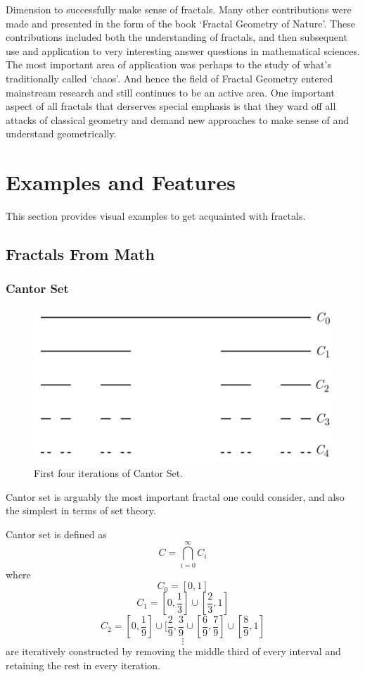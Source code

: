 Dimension to successfully make sense of fractals. Many other contributions were
made and presented in the form of the book `Fractal Geometry of Nature'. These
contributions included both the understanding of fractals, and then subsequent
use and application to very interesting answer questions in mathematical
sciences. The most important area of application was perhaps to the study of
what's traditionally called `chaos'. And hence the field of Fractal Geometry
entered mainstream research and still continues to be an active area.
\newline One important aspect of all fractals that derserves special emphasis is
that they ward off all attacks of classical geometry and demand new approaches
to make sense of and understand geometrically.


\section{Examples and Features}
This section provides visual examples to get acquainted with fractals.
\subsection{Fractals From Math}
\subsubsection{Cantor Set}
\begin{figure}[h!]
  \includegraphics[width=\linewidth]{Pictures/cantor_set.png}
  \caption{First four iterations of Cantor Set.}
  \label{fig:cantor_set}
\end{figure}
Cantor set is arguably the most important fractal one could consider, and also
the simplest in terms of set theory. 
\begin{definition}
    Cantor set is defined as
    \[
        C = \bigcap_{i=0}^{\infty} C_i
    \]
    where  
    \[
        C_0 = [0,1]
    \]
    \[
        C_1 = [0,\frac{1}{3}] \cup [\frac{2}{3}, 1]
    \]
    \[
        C_2 = [0, \frac{1}{9}] \cup [\frac{2}{9}, \frac{3}{9} \cup
        [\frac{6}{9}, \frac{7}{9}] \cup [\frac{8}{9}, 1]
        \]
    \[
        \vdots
    \]
    are iteratively constructed by removing the middle third of every interval
    and retaining the rest in every iteration.
\end{definition}
